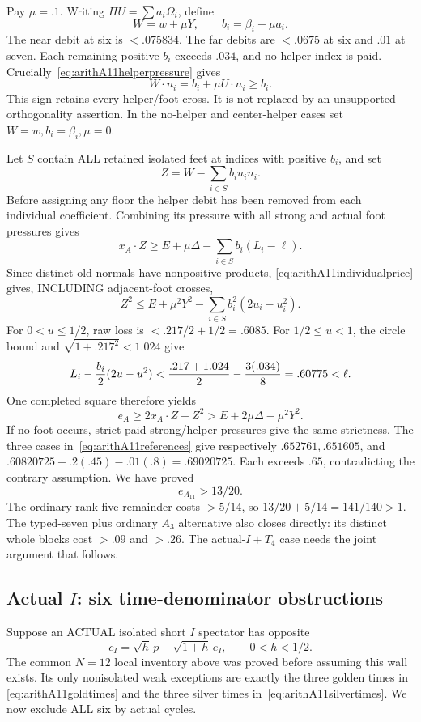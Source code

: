 Pay \(\mu=.1\).
Writing \(\Pi U=\sum a_i\Omega_i\), define
\[
 W=w+\mu Y,\qquad b_i=\beta_i-\mu a_i .
\]
The near debit at six is \(<.075834\).
The far debits are \(<.0675\) at six and
\(.01\) at seven.
Each remaining positive \(b_i\) exceeds
\(.034\), and no helper index is paid.
Crucially~\eqref{eq:arithA11helperpressure} gives
\[
                  W\cdot n_i=b_i+\mu U\cdot n_i\ge b_i.
\tag{A11price}\label{eq:arithA11individualprice}
\]
This sign retains every helper/foot cross.
It is not replaced by an unsupported
orthogonality assertion.
In the no-helper and center-helper cases set
\(W=w,b_i=\beta_i,\mu=0\).

Let \(S\) contain ALL retained isolated feet
at indices with positive \(b_i\), and set
\[
                  Z=W-\sum_{i\in S}b_i u_i n_i .
\]
Before assigning any floor the helper debit
has been removed from each individual
coefficient.  Combining its pressure with
all strong and actual foot pressures gives
\[
 x_A\cdot Z\ge E+\mu\Delta
                    -\sum_{i\in S}b_i(L_i-\ell).
\]
Since distinct old normals have nonpositive
products, \eqref{eq:arithA11individualprice}
gives, INCLUDING adjacent-foot crosses,
\[
 Z^2\le E+\mu^2Y^2
                    -\sum_{i\in S}b_i^2(2u_i-u_i^2).
\]
For \(0<u\le1/2\), raw loss is
\(<.217/2+1/2=.6085\).
For \(1/2\le u<1\), the circle bound and
\(\sqrt{1+.217^2}<1.024\) give
\[
 L_i-\frac{b_i}{2}(2u-u^2)
 <{.217+1.024\over2}-{3(.034)\over8}
 =.60775<\ell .
\]
One completed square therefore yields
\[
 e_A\ge2x_A\cdot Z-Z^2
                      >E+2\mu\Delta-\mu^2Y^2 .
\]
If no foot occurs, strict paid strong/helper
pressures give the same strictness.
The three cases in~\eqref{eq:arithA11references}
give respectively
\(.652761,.651605\), and
\(.60820725+.2(.45)-.01(.8)=.69020725\).
Each exceeds \(.65\), contradicting the
contrary assumption.  We have proved
\[
                            e_{A_{11}}>13/20 .
\tag{A11Urate}\label{eq:arithA11uniform}
\]
The ordinary-rank-five remainder costs \(>5/14\),
so \(13/20+5/14=141/140>1\).
The typed-seven plus ordinary \(A_3\) alternative
also closes directly: its distinct whole
blocks cost \(>.09\) and \(>.26\).
The actual-\(I+T_4\) case needs the joint
argument that follows.

\subsection{Actual \(I\): six time-denominator obstructions}
\label{app:arithA11Itimes}

Suppose an ACTUAL isolated short \(I\) spectator
has opposite
\[
 c_I=\sqrt h\,p-\sqrt{1+h}\,e_I,\qquad 0<h<1/2 .
\]
The common \(N=12\) local inventory above
was proved before assuming this wall exists.
Its only nonisolated weak exceptions are
exactly the three golden times in
\eqref{eq:arithA11goldtimes} and the three
silver times in~\eqref{eq:arithA11silvertimes}.
We now exclude ALL six by actual cycles.


